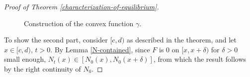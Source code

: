 \documentclass[10pt,a4paper]{amsart}
\numberwithin{equation}{section}
\begin{document}
\begin{proof}[Proof of Theorem \ref{characterization-of-equilibrium}]
\begin{figure}
    \caption{Construction of the convex function $\gamma$.}
    \label{gamma-construction}
\end{figure}   

To show the second part, consider $[c,d)$ as described in the theorem, and let $x\in[c, d)$, $t>0$. By Lemma \ref{N-contained}, since $F$ is $0$ on $[x,x+\delta)$ for $\delta>0$ small enough, $N_t(x)\in[N_0(x), N_0(x+\delta)]$, from which the result follows by the right continuity of $N_0$. 
\end{proof}
\end{document}
